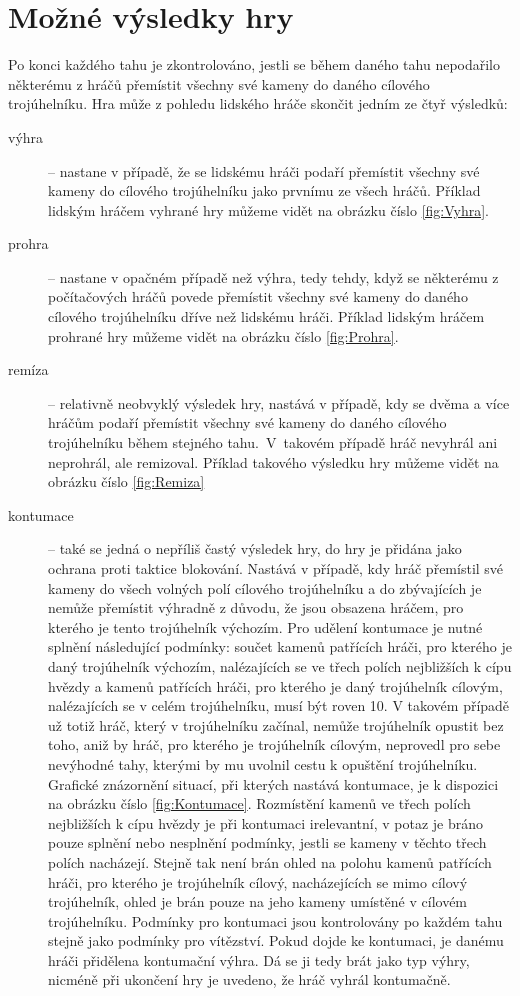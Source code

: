 \section{Možné výsledky hry}
\label{sec:MozneVysledkyHry}
Po konci každého tahu je zkontrolováno, jestli se během daného tahu nepodařilo některému z hráčů přemístit všechny své kameny do daného cílového trojúhelníku. Hra může z pohledu lidského hráče skončit jedním ze čtyř výsledků:
\begin{description}
\item [výhra]  -- nastane v případě, že se lidskému hráči podaří přemístit všechny své kameny do cílového trojúhelníku jako prvnímu ze všech hráčů. Příklad lidským hráčem vyhrané hry můžeme vidět na obrázku číslo \ref{fig:Vyhra}.
\item [prohra]  -- nastane v opačném případě než výhra, tedy tehdy, když se některému z počítačových hráčů povede přemístit všechny své kameny do daného cílového trojúhelníku dříve než lidskému hráči. Příklad lidským hráčem prohrané hry můžeme vidět na obrázku číslo \ref{fig:Prohra}.
\item [remíza]  -- relativně neobvyklý výsledek hry, nastává v případě, kdy se dvěma a více hráčům podaří přemístit všechny své kameny do daného cílového trojúhelníku během stejného tahu.~V~takovém případě hráč nevyhrál ani neprohrál, ale remizoval. Příklad takového výsledku hry můžeme vidět na obrázku číslo \ref{fig:Remiza}
\item [kontumace]  -- také se jedná o nepříliš častý výsledek hry, do hry je přidána jako ochrana proti taktice blokování. Nastává v případě, kdy hráč přemístil své kameny do všech volných polí cílového trojúhelníku a do zbývajících je nemůže přemístit výhradně z důvodu, že jsou obsazena hráčem, pro kterého je tento trojúhelník výchozím. Pro udělení kontumace je nutné splnění následující podmínky: součet kamenů patřících hráči, pro kterého je daný trojúhelník výchozím, nalézajících se ve třech polích nejbližších k cípu hvězdy a kamenů patřících hráči, pro kterého je daný trojúhelník cílovým, nalézajících se v celém trojúhelníku, musí být roven 10. V takovém případě už totiž hráč, který v trojúhelníku začínal, nemůže trojúhelník opustit bez toho, aniž by hráč, pro kterého je trojúhelník cílovým, neprovedl pro sebe nevýhodné tahy, kterými by mu uvolnil cestu k opuštění trojúhelníku. Grafické znázornění situací, při kterých nastává kontumace, je k dispozici na obrázku číslo \ref{fig:Kontumace}. Rozmístění kamenů ve třech polích nejbližších k cípu hvězdy je při kontumaci irelevantní, v potaz je bráno pouze splnění nebo nesplnění podmínky, jestli se kameny v těchto třech polích nacházejí. Stejně tak není brán ohled na polohu kamenů patřících hráči, pro kterého je trojúhelník cílový, nacházejících se mimo cílový trojúhelník, ohled je brán pouze na jeho kameny umístěné v cílovém trojúhelníku. Podmínky pro kontumaci jsou kontrolovány po každém tahu stejně jako podmínky pro vítězství. Pokud dojde ke kontumaci, je danému hráči přidělena kontumační výhra. Dá se ji tedy brát jako typ výhry, nicméně při ukončení hry je uvedeno, že hráč vyhrál kontumačně.
\end{description}
